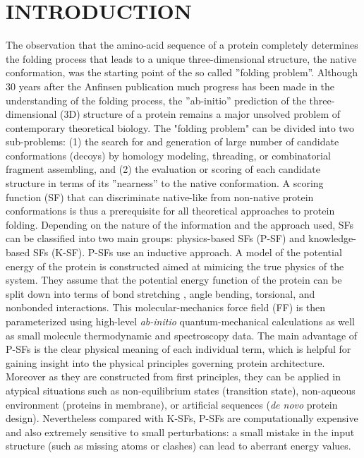 \documentclass[a4paper,20pt,notitlepage,openbib]{article}
\begin{document}
\section{INTRODUCTION}
The observation that the amino-acid sequence of a protein completely determines the folding process that leads to a unique
three-dimensional structure, the native conformation, was the starting point of the so called ''folding problem''.
Although 30 years after the Anfinsen publication \cite{anf:fol} much progress has been made in the understanding of the folding process,
the ''ab-initio'' prediction of the three-dimensional (3D) structure of a protein remains a major unsolved problem of contemporary theoretical biology.
The "folding problem" can be divided into two sub-problems: (1) the search for and generation of large number of candidate conformations (decoys) 
by homology modeling, threading, or combinatorial fragment assembling, and (2) the evaluation or scoring of each candidate structure in terms of its ''nearness'' to the native conformation. A scoring function (SF) that can discriminate native-like from non-native protein conformations is thus a prerequisite 
for all theoretical approaches to protein folding. Depending on the nature of the information and the approach used, SFs can be classified into two main groups: physics-based SFs (P-SF) and  knowledge-based SFs (K-SF).
P-SFs use an inductive approach. A model of the potential energy of the protein is constructed aimed at mimicing the true physics of the
system. They assume that the potential energy function of the protein can be split down into terms of bond stretching , angle bending,
torsional, and nonbonded interactions. This molecular-mechanics force field (FF)
\cite{vanGunsteren:gromos01,ponder:paper01,brooks:charm,jorgensen:OPLS,levitt:ENCAD} is then parameterized using high-level
\textit{ab-initio} quantum-mechanical calculations as well as small molecule thermodynamic and spectroscopy data. The main advantage of
P-SFs is the clear physical meaning of each individual term, which is helpful for gaining insight into the physical principles
governing protein architecture. Moreover as they are constructed from first principles, they can be applied in atypical situations
 such as non-equilibrium states (transition state), non-aqueous environment (proteins in membrane), or artificial sequences
(\textit{de novo} protein design). Nevertheless compared with K-SFs, P-SFs are computationally expensive and also extremely sensitive to 
small perturbations: a small mistake in the input structure (such as missing atoms or clashes) can lead to aberrant energy values. 
\end{document}
